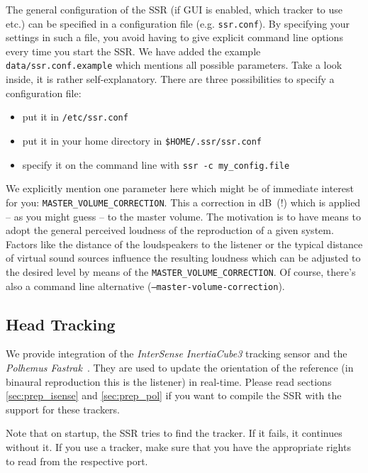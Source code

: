 The general configuration of the SSR (if GUI
is enabled, which tracker to use etc.) can be specified in a configuration file
(e.g. \texttt{ssr.conf}). By specifying
your settings in such a file, you avoid having to give explicit command
line options every time you start the SSR. We have added the example
\texttt{data/ssr.conf.example} which mentions all possible parameters.
Take a look inside, it is rather self-explanatory.
There are three possibilities to specify a configuration file:
\begin{itemize}
\item put it in \texttt{/etc/ssr.conf}
\item put it in your home directory in \texttt{\$HOME/.ssr/ssr.conf}
\item specify it on the command line with \texttt{ssr -c my\_config.file}
\end{itemize}

We explicitly mention one parameter here which might be of immediate interest
for you: \texttt{MASTER\_VOLUME\_CORRECTION}. This a correction in dB~(!) which is
applied -- as you might guess -- to the master volume. The motivation is to have
means to adopt the general perceived loudness of the reproduction of a given
system. Factors like the distance of the loudspeakers to the listener or the
typical distance of virtual sound sources influence the resulting loudness
which can be adjusted to the desired level by means of the
\texttt{MASTER\_VOLUME\_CORRECTION}. Of course, there's also a command line
alternative (\texttt{--master-volume-correction}).

\subsection{Head Tracking}
\label{sec:head_tracking}

We provide integration of the \emph{InterSense InertiaCube3} tracking sensor
\cite{intersense} and the  \emph{Polhemus Fastrak}~\cite{fastrack}. They are used to
update the orientation of the reference (in binaural reproduction this is the
listener) in real-time. Please read sections \ref{sec:prep_isense} and
\ref{sec:prep_pol} if you want to compile the SSR with the support for these
trackers.

Note that on startup, the SSR tries to find the tracker. If it fails, it
continues without it. If you use a tracker, make sure that you have the
appropriate rights to read from the respective port.

